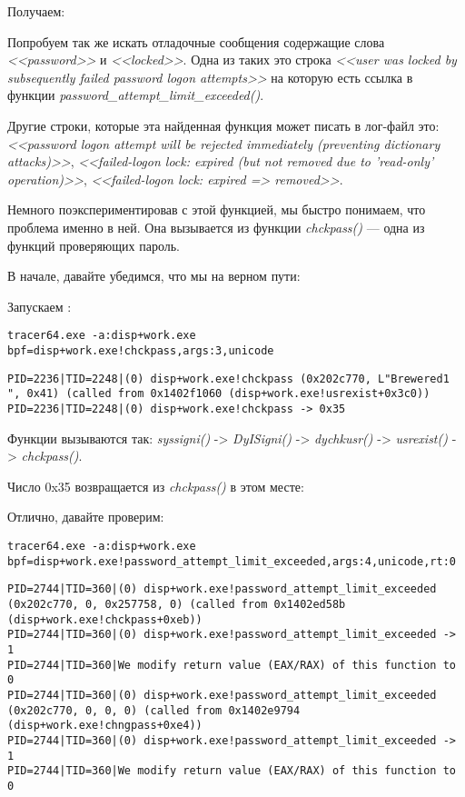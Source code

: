Получаем:



Попробуем так же искать отладочные сообщения содержащие слова \emph{<<password>>} и \emph{<<locked>>}.
Одна из таких это строка \emph{<<user was locked by subsequently failed password logon attempts>>} на которую есть ссылка в \\
функции \emph{password\_attempt\_limit\_exceeded()}.

Другие строки, которые эта найденная функция может писать в лог-файл это: 
\emph{<<password logon attempt will be rejected immediately (preventing dictionary attacks)>>}, \emph{<<failed-logon lock: expired (but not removed due to 'read-only' operation)>>}, \emph{<<failed-logon lock: expired => removed>>}.

Немного поэкспериментировав с этой функцией, мы быстро понимаем, что проблема именно в ней.
Она вызывается из функции \emph{chckpass()} --- одна из функций проверяющих пароль.

В начале, давайте убедимся, что мы на верном пути:

Запускаем \tracer:

\begin{lstlisting}
tracer64.exe -a:disp+work.exe bpf=disp+work.exe!chckpass,args:3,unicode
\end{lstlisting}

\begin{lstlisting}
PID=2236|TID=2248|(0) disp+work.exe!chckpass (0x202c770, L"Brewered1                               ", 0x41) (called from 0x1402f1060 (disp+work.exe!usrexist+0x3c0))
PID=2236|TID=2248|(0) disp+work.exe!chckpass -> 0x35
\end{lstlisting}

Функции вызываются так: \emph{syssigni()} -> \emph{DyISigni()} -> \emph{dychkusr()} -> \emph{usrexist()} -> \emph{chckpass()}.

Число 0x35 возвращается из \emph{chckpass()} в этом месте:



Отлично, давайте проверим:

\begin{lstlisting}
tracer64.exe -a:disp+work.exe bpf=disp+work.exe!password_attempt_limit_exceeded,args:4,unicode,rt:0
\end{lstlisting}

\begin{lstlisting}
PID=2744|TID=360|(0) disp+work.exe!password_attempt_limit_exceeded (0x202c770, 0, 0x257758, 0) (called from 0x1402ed58b (disp+work.exe!chckpass+0xeb))
PID=2744|TID=360|(0) disp+work.exe!password_attempt_limit_exceeded -> 1
PID=2744|TID=360|We modify return value (EAX/RAX) of this function to 0
PID=2744|TID=360|(0) disp+work.exe!password_attempt_limit_exceeded (0x202c770, 0, 0, 0) (called from 0x1402e9794 (disp+work.exe!chngpass+0xe4))
PID=2744|TID=360|(0) disp+work.exe!password_attempt_limit_exceeded -> 1
PID=2744|TID=360|We modify return value (EAX/RAX) of this function to 0
\end{lstlisting}

